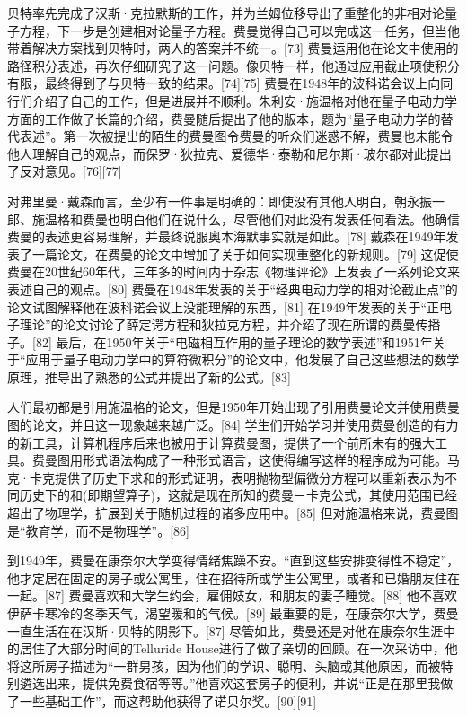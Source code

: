 贝特率先完成了汉斯·克拉默斯的工作，并为兰姆位移导出了重整化的非相对论量子方程，下一步是创建相对论量子方程。费曼觉得自己可以完成这一任务，但当他带着解决方案找到贝特时，两人的答案并不统一。[73] 费曼运用他在论文中使用的路径积分表述，再次仔细研究了这一问题。像贝特一样，他通过应用截止项使积分有限，最终得到了与贝特一致的结果。[74][75] 费曼在1948年的波科诺会议上向同行们介绍了自己的工作，但是进展并不顺利。朱利安·施温格对他在量子电动力学方面的工作做了长篇的介绍，费曼随后提出了他的版本，题为“量子电动力学的替代表述”。第一次被提出的陌生的费曼图令费曼的听众们迷惑不解，费曼也未能令他人理解自己的观点，而保罗·狄拉克、爱德华·泰勒和尼尔斯·玻尔都对此提出了反对意见。[76][77]

对弗里曼·戴森而言，至少有一件事是明确的：即使没有其他人明白，朝永振一郎、施温格和费曼也明白他们在说什么，尽管他们对此没有发表任何看法。他确信费曼的表述更容易理解，并最终说服奥本海默事实就是如此。[78] 戴森在1949年发表了一篇论文，在费曼的论文中增加了关于如何实现重整化的新规则。[79] 这促使费曼在20世纪60年代，三年多的时间内于杂志《物理评论》上发表了一系列论文来表述自己的观点。[80] 费曼在1948年发表的关于“经典电动力学的相对论截止点”的论文试图解释他在波科诺会议上没能理解的东西，[81] 在1949年发表的关于“正电子理论”的论文讨论了薛定谔方程和狄拉克方程，并介绍了现在所谓的费曼传播子。[82] 最后，在1950年关于“电磁相互作用的量子理论的数学表述”和1951年关于“应用于量子电动力学中的算符微积分”的论文中，他发展了自己这些想法的数学原理，推导出了熟悉的公式并提出了新的公式。[83]

人们最初都是引用施温格的论文，但是1950年开始出现了引用费曼论文并使用费曼图的论文，并且这一现象越来越广泛。[84] 学生们开始学习并使用费曼创造的有力的新工具，计算机程序后来也被用于计算费曼图，提供了一个前所未有的强大工具。费曼图用形式语法构成了一种形式语言，这使得编写这样的程序成为可能。马克·卡克提供了历史下求和的形式证明，表明抛物型偏微分方程可以重新表示为不同历史下的和(即期望算子)，这就是现在所知的费曼－卡克公式，其使用范围已经超出了物理学，扩展到关于随机过程的诸多应用中。[85] 但对施温格来说，费曼图是“教育学，而不是物理学”。[86]

到1949年，费曼在康奈尔大学变得情绪焦躁不安。“直到这些安排变得性不稳定”，他才定居在固定的房子或公寓里，住在招待所或学生公寓里，或者和已婚朋友住在一起。[87] 费曼喜欢和大学生约会，雇佣妓女，和朋友的妻子睡觉。[88] 他不喜欢伊萨卡寒冷的冬季天气，渴望暖和的气候。[89] 最重要的是，在康奈尔大学，费曼一直生活在在汉斯·贝特的阴影下。[87] 尽管如此，费曼还是对他在康奈尔生涯中的居住了大部分时间的Telluride House进行了做了亲切的回顾。在一次采访中，他将这所房子描述为“一群男孩，因为他们的学识、聪明、头脑或其他原因，而被特别遴选出来，提供免费食宿等等。”他喜欢这套房子的便利，并说“正是在那里我做了一些基础工作”，而这帮助他获得了诺贝尔奖。[90][91]

